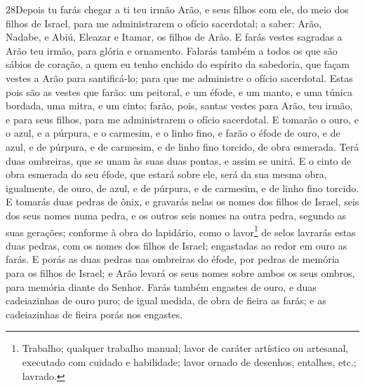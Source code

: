 \lettrine{28} Depois tu farás chegar a ti teu irmão Arão, e
seus filhos com ele, do meio dos filhos de Israel, para me
administrarem o ofício sacerdotal; a saber: Arão, Nadabe, e Abiú,
Eleazar e Itamar, os filhos de Arão. E farás vestes sagradas a
Arão teu irmão, para glória e ornamento. Falarás também a todos
os que são sábios de coração, a quem eu tenho enchido do espírito da
sabedoria, que façam vestes a Arão para santificá-lo; para que me
administre o ofício sacerdotal. Estas pois são as vestes que
farão: um peitoral, e um éfode, e um manto, e uma túnica bordada,
uma mitra, e um cinto; farão, pois, santas vestes para Arão, teu
irmão, e para seus filhos, para me administrarem o ofício
sacerdotal. E tomarão o ouro, e o azul, e a púrpura, e o
carmesim, e o linho fino, e farão o éfode de ouro, e de azul, e
de púrpura, e de carmesim, e de linho fino torcido, de obra
esmerada. Terá duas ombreiras, que se unam às suas duas pontas,
e assim se unirá. E o cinto de obra esmerada do seu éfode, que
estará sobre ele, será da sua mesma obra, igualmente, de ouro, de
azul, e de púrpura, e de carmesim, e de linho fino torcido. E
tomarás duas pedras de ônix, e gravarás nelas os nomes dos filhos de
Israel, seis dos seus nomes numa pedra, e os outros seis
nomes na outra pedra, segundo as suas gerações; conforme à
obra do lapidário, como o lavor\footnote{Trabalho; qualquer trabalho
manual; lavor de caráter artístico ou artesanal, executado com
cuidado e habilidade; lavor ornado de desenhos, entalhes, etc.;
lavrado.} de selos lavrarás estas duas pedras, com os nomes dos
filhos de Israel; engastadas ao redor em ouro as farás. E
porás as duas pedras nas ombreiras do éfode, por pedras de memória
para os filhos de Israel; e Arão levará os seus nomes sobre ambos os
seus ombros, para memória diante do Senhor. Farás também
engastes de ouro, e duas cadeiazinhas de ouro puro; de igual
medida, de obra de fieira as farás; e as cadeiazinhas de fieira
porás nos engastes.

